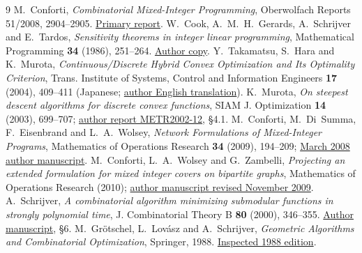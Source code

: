 \documentclass[11pt]{article}
\begin{document}
\begin{thebibliography}{9}
 M.~Conforti, \emph{Combinatorial Mixed-Integer Programming},
Oberwolfach Reports 51/2008, 2904--2905.
\href{https://ems.press/content/serial-article-files/46195}{Primary report}.
 W.~Cook, A.~M.~H.~Gerards, A.~Schrijver and E.~Tardos,
\emph{Sensitivity theorems in integer linear programming}, Mathematical
Programming \textbf{34} (1986), 251--264.
\href{https://www.math.uwaterloo.ca/~bico/papers/sensitivity.pdf}{Author copy}.
 Y.~Takamatsu, S.~Hara and K.~Murota,
\emph{Continuous/Discrete Hybrid Convex Optimization and Its Optimality
Criterion}, Trans. Institute of Systems, Control and Information Engineers
\textbf{17} (2004), 409--411 (Japanese;
\href{https://kzmurota.fpark.tmu.ac.jp/paper/THM04hybridLenglish.pdf}{author English translation}).
 K.~Murota, \emph{On steepest descent algorithms for discrete
convex functions}, SIAM J. Optimization \textbf{14} (2003), 699--707;
\href{https://www.keisu.t.u-tokyo.ac.jp/data/2002/METR02-12.pdf}{author report METR2002-12}, \S4.1.
 M.~Conforti, M.~Di~Summa, F.~Eisenbrand and L.~A.~Wolsey,
\emph{Network Formulations of Mixed-Integer Programs}, Mathematics of
Operations Research \textbf{34} (2009), 194--209;
\href{https://www.math.uwaterloo.ca/~bico/bellairs/network.pdf}{March 2008 author manuscript}.
 M.~Conforti, L.~A.~Wolsey and G.~Zambelli,
\emph{Projecting an extended formulation for mixed integer covers on bipartite
graphs}, Mathematics of Operations Research (2010);
\href{https://personal.lse.ac.uk/Zambelli/papers/mix-tree.pdf}{author manuscript revised November 2009}.
 A.~Schrijver, \emph{A combinatorial algorithm minimizing
submodular functions in strongly polynomial time}, J. Combinatorial Theory B
\textbf{80} (2000), 346--355.
\href{https://homepages.cwi.nl/~lex/files/minsubm6.pdf}{Author manuscript}, \S6.
 M.~Gr\"otschel, L.~Lov\'asz and A.~Schrijver,
\emph{Geometric Algorithms and Combinatorial Optimization}, Springer, 1988.
\href{https://www.zib.de/userpage/groetschel/pubnew/paper/groetschellovaszschrijver1988.pdf}{Inspected 1988 edition}.
\end{thebibliography}
\end{document}
